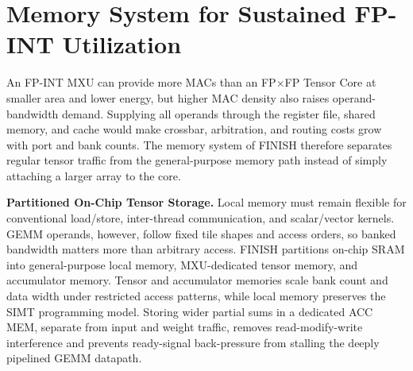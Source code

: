 \documentclass[sigconf,anonymous,nonacm]{acmart}
\newcommand{\ours}{\textsc{FINISH}}
\newcommand{\fpint}{FP-INT}
\begin{document}




\iffalse
\section[Memory System for Sustained FP-INT Utilization]{Memory System for Sustained \texorpdfstring{\fpint{}}{FP-INT} Utilization}
\label{sec:memory-system}

An \fpint{} MXU can provide more MACs than an FP$\times$FP Tensor Core at smaller area and lower energy, but higher MAC density also raises operand-bandwidth demand. Supplying all operands through the register file, shared memory, and cache would make crossbar, arbitration, and routing costs grow with port and bank counts. The memory system of \ours{} therefore separates regular tensor traffic from the general-purpose memory path instead of simply attaching a larger array to the core.

\textbf{Partitioned On-Chip Tensor Storage.}
Local memory must remain flexible for conventional load/store, inter-thread communication, and scalar/vector kernels. GEMM operands, however, follow fixed tile shapes and access orders, so banked bandwidth matters more than arbitrary access. \ours{} partitions on-chip SRAM into general-purpose local memory, MXU-dedicated tensor memory, and accumulator memory. Tensor and accumulator memories scale bank count and data width under restricted access patterns, while local memory preserves the SIMT programming model. 
Storing wider partial sums in a dedicated ACC MEM, separate from input and weight traffic, removes read-modify-write interference and prevents ready-signal back-pressure from stalling the deeply pipelined GEMM datapath.
\end{document}
